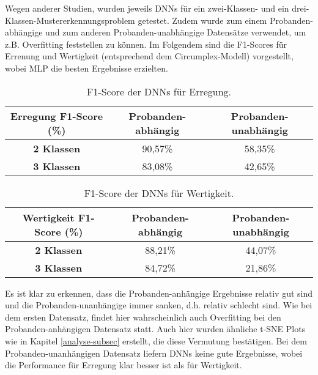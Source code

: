 

Wegen anderer Studien, wurden jeweils DNNs für ein zwei-Klassen- und ein drei-Klassen-Mustererkennungsproblem getestet.
Zudem wurde zum einem Probanden-abhängige und zum anderen Probanden-unabhängige Datensätze verwendet, um z.B. Overfitting feststellen zu können.
Im Folgendem sind die F1-Scores für Errenung und Wertigkeit (entsprechend dem Circumplex-Modell) vorgestellt, wobei MLP die besten Ergebnisse erzielten. \\ 


\begin{table}[H] \centering
\begin{tabular}{|c|c|c|}
\hline
\textbf{Erregung F1-Score (\%)} & \textbf{Probanden-abhängig} & \textbf{Probanden-unabhängig} \\ \hline
\textbf{2 Klassen} & 90,57\% & 58,35\% \\ \hline
\textbf{3 Klassen} & 83,08\% & 42,65\% \\ \hline
\end{tabular} \vspace{0.2cm}
\caption{ F1-Score der DNNs für Erregung. } \end{table}



\begin{table}[H] \centering
\begin{tabular}{|c|c|c|}
\hline
\textbf{Wertigkeit F1-Score (\%)} & \textbf{Probanden-abhängig} & \textbf{Probanden-unabhängig} \\ \hline
\textbf{2 Klassen} & 88,21\% & 44,07\% \\ \hline
\textbf{3 Klassen} & 84,72\% & 21,86\% \\ \hline
\end{tabular} \vspace{0.2cm}
\caption{ F1-Score der DNNs für Wertigkeit. } \end{table}


Es ist klar zu erkennen, dass die Probanden-anhängige Ergebnisse relativ gut sind und die Probanden-unanhängige immer sanken, d.h. relativ schlecht sind. 
Wie bei dem ersten Datensatz, findet hier wahrscheinlich auch Overfitting bei den Probanden-anhängigen Datensatz statt.
Auch hier wurden ähnliche t-SNE Plots wie in Kapitel \ref{analyse-subsec} erstellt, die diese Vermutung bestätigen. 
Bei dem Probanden-unanhängigen Datensatz liefern DNNs keine gute Ergebnisse, wobei die Performance für Erregung klar besser ist als für Wertigkeit. 
